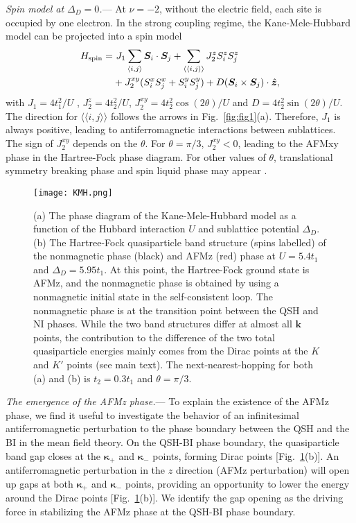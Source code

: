 \documentclass[twocolumn,aps,prl,superscriptaddress]{revtex4-2}
\begin{document}
\textit{Spin model at $\Delta_D=0$.}--- At $\nu = -2$, without the electric field, each site is occupied by one electron. In the strong coupling regime, the Kane-Mele-Hubbard model can be projected into a spin model \cite{hohenadler2012quantum,rachel2010topological,zare2021spin}
\begin{equation}\label{eq:spin}
\begin{aligned}
    H_{\rm spin} = & ~J_1 \sum_{\langle i, j\rangle} \bm{S}_i \cdot \bm{S}_j + 
    \sum_{\langle\langle i, j \rangle\rangle} J_2^z S_i^z S_j^z \\
    & + J_2^{xy} (S_i^x S_j^x + S_i^y S_j^y) + D (\bm{S}_i\times \bm{S}_j) \cdot \hat{\bm{z}}, 
\end{aligned}
\end{equation}
with $J_1=4t_1^2/U$ , $J_2^z = 4 t_2^2/U$, $J_2^{xy} = 4t_2^2 \cos(2\theta)/U$ and $D = 4t_2^2 \sin(2\theta)/U$. The direction for $\langle\langle i, j\rangle\rangle$ follows the arrows in Fig.~\ref{fig:fig1}(a).  Therefore, $J_1$ is always positive, leading to antiferromagnetic interactions between sublattices. The sign of $J_2^{xy}$ depends on the $\theta$. For $\theta = \pi / 3$, $J_2^{xy} < 0$, leading to the AFMxy phase in the Hartree-Fock phase diagram. For other values of $\theta$, translational symmetry breaking phase and spin liquid phase may appear \cite{zare2021spin}.

\begin{figure}
\centering
\texttt{[image: KMH.png]}
\caption{(a) The phase diagram of the Kane-Mele-Hubbard model as a function of the Hubbard interaction $U$ and sublattice potential $\Delta_D$. (b) The Hartree-Fock quasiparticle band structure (spins labelled) of the nonmagnetic phase (black) and AFMz (red) phase at $U = 5.4 t_1$ and $\Delta_D = 5.95 t_1$. At this point, the Hartree-Fock ground state is AFMz, and the nonmagnetic phase is obtained by using a nonmagnetic initial state in the self-consistent loop. The nonmagnetic phase is at the transition point between the QSH and NI phases. While the two band structures differ at almost all $\bm{k}$ points, the contribution to the difference of the two total quasiparticle energies mainly comes from the Dirac points at the $K$ and $K'$ points (see main text). The next-nearest-hopping for both (a) and (b) is $t_2 = 0.3 t_1$ and $\theta = \pi/3$.\label{fig:KMH}}
\end{figure}

\textit{The emergence of the AFMz phase.}---
To explain the existence of the AFMz phase, we find it useful to investigate the behavior of an infinitesimal antiferromagnetic perturbation to the phase boundary between the QSH and the BI in the mean field theory. On the QSH-BI phase boundary, the quasiparticle band gap closes at the $\bm{\kappa_+}$ and $\bm{\kappa_-}$ points, forming Dirac points [Fig.~\ref{fig:KMH}(b)]. An antiferromagnetic perturbation in the $z$ direction (AFMz perturbation) will open up gaps at both $\bm{\kappa_+}$ and $\bm{\kappa_-}$ points, providing an opportunity to lower the energy around the Dirac points [Fig.~\ref{fig:KMH}(b)]. We identify the gap opening as the driving force in stabilizing the AFMz phase at the QSH-BI phase boundary.
\end{document}
